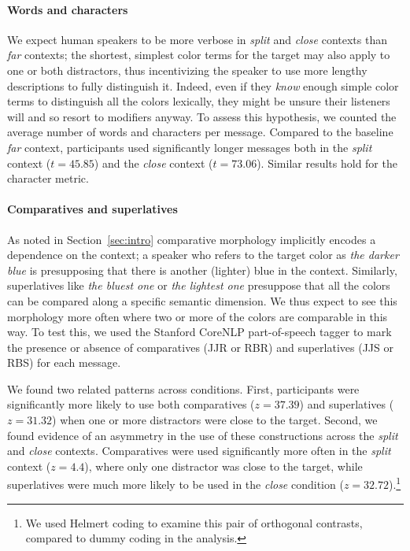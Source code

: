 \documentclass[11pt,letterpaper]{article}
\newcommand{\word}{\textit}
\renewcommand{\|}{\mid}
\newcommand{\secref}[1]{Section~\ref{#1}}
\newcommand{\cond}{\emph}
\begin{document}
\paragraph{Words and characters}
We expect human speakers to be more verbose in \cond{split} and \cond{close} 
contexts than \cond{far} contexts; the shortest, simplest color terms for the target 
may also apply to one or both distractors, thus incentivizing the speaker to use more
lengthy descriptions to fully distinguish it. Indeed, even if they \emph{know} 
enough simple color terms to distinguish all the colors
lexically, they might be unsure their listeners will and so
resort to modifiers anyway. To assess this hypothesis,
we counted the average number of words and characters per message. 
Compared to the baseline \cond{far} context, participants used significantly longer messages both in the \cond{split} context ($t =  45.85$) and the \cond{close} context ($t = 73.06$). Similar results hold for the character metric.

\paragraph{Comparatives and superlatives}
As noted in \secref{sec:intro} comparative morphology implicitly
encodes a dependence on the context; a speaker who refers to the
target color as \word{the darker blue} is presupposing that there is
another (lighter) blue in the context. Similarly, superlatives like
\word{the bluest one} or \word{the lightest one} presuppose that all
the colors can be compared along a specific semantic dimension. We
thus expect to see this morphology more often where two or more of the
colors are comparable in this way. To test this, we used the Stanford
CoreNLP part-of-speech tagger \cite{Toutanova2003} to mark the presence or absence of comparatives (JJR or RBR) and superlatives (JJS or RBS) for each message. 

We found two related patterns across conditions. First, participants were significantly 
more likely to use both comparatives ($z = 37.39$) and superlatives ($z = 31.32$) 
when one or more distractors were close to the target. Second, we found evidence of 
an asymmetry in  the use of these constructions across the \cond{split} and 
\cond{close} contexts. Comparatives were used significantly more often in the 
\cond{split} context ($z = 4.4$), where only one distractor was close to the target, 
while superlatives were much more likely to be used in the \cond{close} condition 
($z = 32.72$).\footnote{We used Helmert coding to examine this pair of orthogonal 
contrasts, compared to dummy coding in the analysis.}
\end{document}
